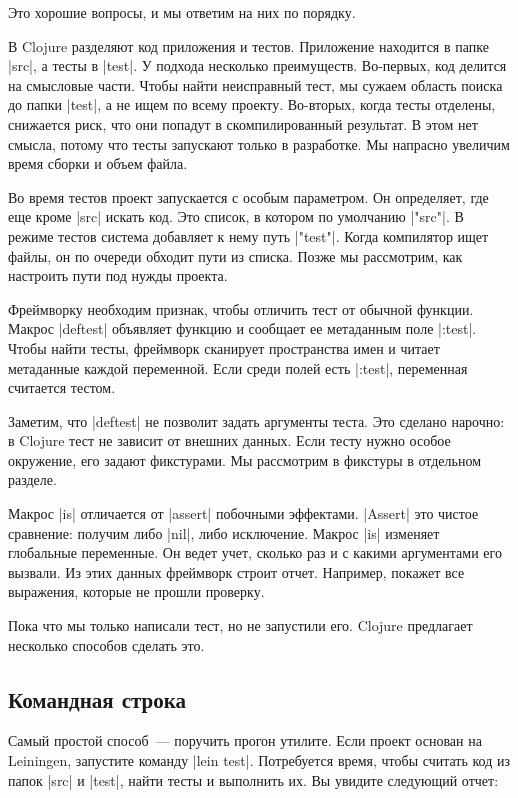 Это хорошие вопросы, и мы ответим на них по порядку.

В Clojure разделяют код приложения и тестов. Приложение находится в папке
\spverb|src|, а тесты в \spverb|test|. У подхода несколько
преимуществ. Во-первых, код делится на смысловые части. Чтобы найти неисправный
тест, мы сужаем область поиска до папки \spverb|test|, а не ищем по всему
проекту. Во-вторых, когда тесты отделены, снижается риск, что они попадут в
скомпилированный результат. В этом нет смысла, потому что тесты запускают только
в разработке. Мы напрасно увеличим время сборки и объем файла.

Во время тестов проект запускается с особым параметром. Он определяет, где еще
кроме \spverb|src| искать код. Это список, в котором по умолчанию
\spverb|"src"|. В режиме тестов система добавляет к нему путь
\spverb|"test"|. Когда компилятор ищет файлы, он по очереди обходит пути из
списка. Позже мы рассмотрим, как настроить пути под нужды проекта.

Фреймворку необходим признак, чтобы отличить тест от обычной функции. Макрос
\spverb|deftest| объявляет функцию и сообщает ее метаданным поле
\spverb|:test|. Чтобы найти тесты, фреймворк сканирует пространства имен и
читает метаданные каждой переменной. Если среди полей есть \spverb|:test|,
переменная считается тестом.

Заметим, что \spverb|deftest| не позволит задать аргументы теста. Это сделано
нарочно: в Clojure тест не зависит от внешних данных. Если тесту нужно особое
окружение, его задают фикстурами. Мы рассмотрим в фикстуры в отдельном разделе.

Макрос \spverb|is| отличается от \spverb|assert| побочными
эффектами. \spverb|Assert| это чистое сравнение: получим либо \spverb|nil|, либо
исключение. Макрос \spverb|is| изменяет глобальные переменные. Он ведет учет,
сколько раз и с какими аргументами его вызвали. Из этих данных фреймворк строит
отчет. Например, покажет все выражения, которые не прошли проверку.

Пока что мы только написали тест, но не запустили его. Clojure предлагает
несколько способов сделать это.

\subsection{Командная строка}

Самый простой способ~--- поручить прогон утилите. Если проект основан на
Leiningen, запустите команду \spverb|lein test|.
Потребуется время, чтобы считать код из папок \spverb|src| и
\spverb|test|, найти тесты и выполнить их. Вы увидите следующий отчет:

